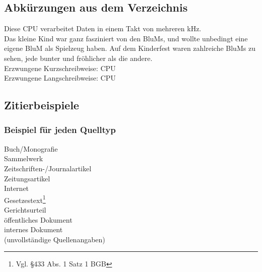 \subsection{Abkürzungen aus dem Verzeichnis}

Diese \ac{CPU} verarbeitet Daten in einem Takt von mehreren \ac{kHz}.\\
Das kleine Kind war ganz fasziniert von den \acp{BluM}, und wollte unbedingt eine eigene \ac{BluM} als Spielzeug haben. 
Auf dem Kinderfest waren zahlreiche \acp{BluM} zu sehen, jede bunter und fröhlicher als die andere.\\

Erzwungene Kurzschreibweise: \acs{CPU}\\
Erzwungene Langschreibweise: \acl{CPU}

\newpage
\subsection{Zitierbeispiele}
\subsubsection{Beispiel für jeden Quelltyp}%

Buch/Monografie\\
Sammelwerk\\
Zeitschriften-/Journalartikel\\
Zeitungsartikel\\
Internet\\%
Gesetzestext\footnote{Vgl. §433 Abs. 1 Satz 1 BGB}\nocite{bgb}\\
Gerichtsurteil\\
öffentliches Dokument\\
internes Dokument\\%
(unvollständige Quellenangaben)

